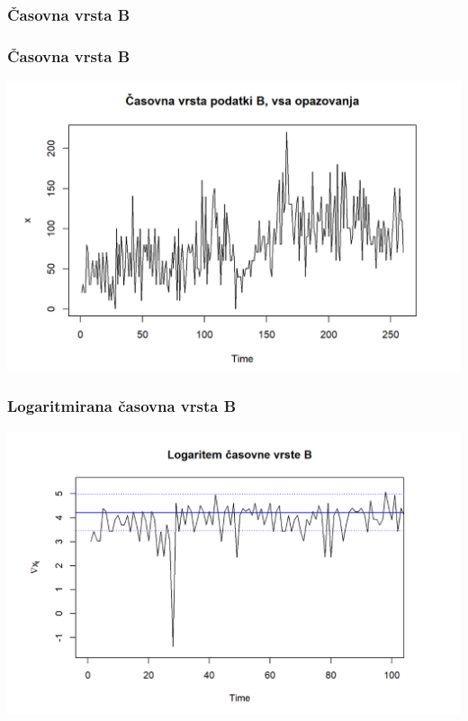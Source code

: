 \documentclass[10pt]{beamer}
\begin{document}

\begin{frame}
\frametitle{Časovna vrsta B}

\end{frame}



\begin{frame}
\frametitle{Časovna vrsta B}
\includegraphics[width=1\textwidth]{casovnaB.png}
\end{frame}

\begin{frame}
\frametitle{Logaritmirana časovna vrsta B}
\includegraphics[width=1\textwidth]{logB.png}
\end{frame}
\end{document}
